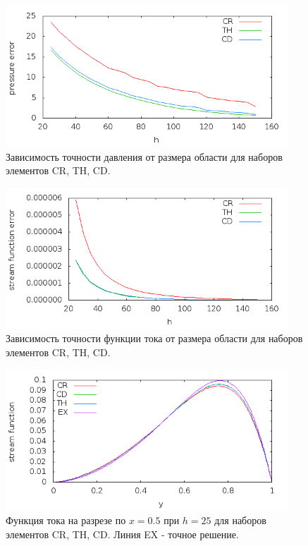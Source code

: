 \documentclass[12pt]{article}
\begin{document}
\begin{figure}
	\begin{center}
		\includegraphics[width=400px]{pics/p_err}
		\caption{Зависимость точности давления от размера области для наборов элементов CR, TH, CD.}
		\label{fg:p_err}
	\end{center}
\end{figure}

\begin{figure}
	\begin{center}
		\includegraphics[width=400px]{pics/psi_err}
		\caption{Зависимость точности функции тока от размера области для наборов элементов CR, TH, CD.}
		\label{fg:psi_err}
	\end{center}
\end{figure}

\begin{figure}
	\begin{center}
		\includegraphics[width=400px]{pics/psi_25}
		\caption{Функция тока на разрезе по $x=0.5$ при $h=25$ для наборов элементов CR, TH, CD. Линия EX - точное решение.}
		\label{fg:psi_25}
	\end{center}
\end{figure}
\end{document}
